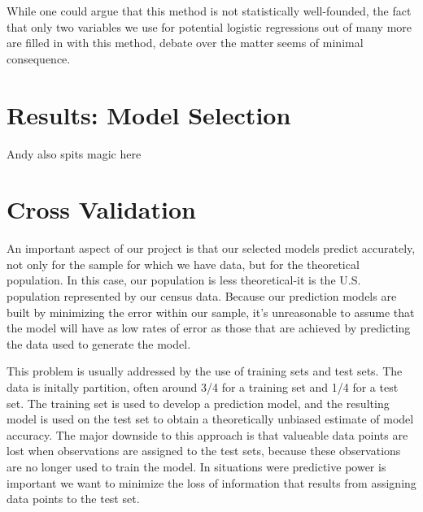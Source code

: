 \documentclass[11pt]{article}
\begin{document}
While one could argue that this method is not statistically well-founded, the fact that only two variables we use for potential logistic regressions out of many more are filled in with this method, debate over the matter seems of minimal consequence.

\section{ Results: Model Selection}
Andy also spits magic here
\section{Cross Validation}
An important aspect of our project is that our selected models predict accurately, not only for the sample for which we have data, but for the theoretical population. In this case, our population is less theoretical-it is the U.S. population represented by our census data. Because our prediction models are built by minimizing the error within our sample, it's unreasonable to assume that the model will have as low rates of error as those that are achieved by predicting the data used to generate the model.


This problem is usually addressed by the use of training sets and test sets. The data is initally partition, often around 3/4 for a training set and 1/4 for a test set. The training set is used to develop a prediction model, and the resulting model is used on the test set to obtain a theoretically unbiased estimate of model accuracy. The major downside to this approach is that valueable data points are lost when observations are assigned to the test sets, because these observations are no longer used to train the model. In situations were predictive power is important we want to minimize the loss of information that results from assigning data points to the test set. 
\end{document}
